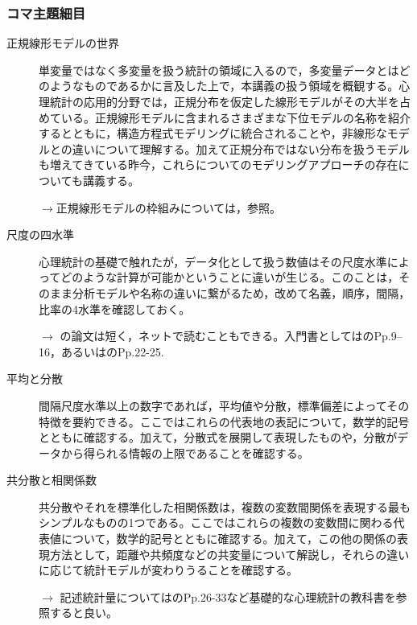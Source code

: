 \subsubsection{コマ主題細目}
\begin{description}
\item[正規線形モデルの世界]単変量ではなく多変量を扱う統計の領域に入るので，多変量データとはどのようなものであるかに言及した上で，本講義の扱う領域を概観する。心理統計の応用的分野では，正規分布を仮定した線形モデルがその大半を占めている。正規線形モデルに含まれるさまざまな下位モデルの名称を紹介するとともに，構造方程式モデリングに統合されることや，非線形なモデルとの違いについて理解する。加えて正規分布ではない分布を扱うモデルも増えてきている昨今，これらについてのモデリングアプローチの存在についても講義する。
\begin{flushright}
    $\to$正規線形モデルの枠組みについては，\citet{三中2018}参照。
\end{flushright}

\item[尺度の四水準]心理統計の基礎で触れたが，データ化として扱う数値はその尺度水準によってどのような計算が可能かということに違いが生じる。このことは，そのまま分析モデルや名称の違いに繋がるため，改めて名義，順序，間隔，比率の4水準を確認しておく。
\begin{flushright}
    $\to$ \citet{stevens1946}の論文は短く，ネットで読むこともできる。入門書としては\citet{川端201408}のPp.9--16，あるいは\citet{Yamada2004}のPp.22-25.
\end{flushright}

\item[平均と分散]間隔尺度水準以上の数字であれば，平均値や分散，標準偏差によってその特徴を要約できる。ここではこれらの代表地の表記について，数学的記号とともに確認する。加えて，分散式を展開して表現したものや，分散がデータから得られる情報の上限であることを確認する。

\item[共分散と相関係数]共分散やそれを標準化した相関係数は，複数の変数間関係を表現する最もシンプルなものの1つである。ここではこれらの複数の変数間に関わる代表値について，数学的記号とともに確認する。加えて，この他の関係の表現方法として，距離や共頻度などの共変量について解説し，それらの違いに応じて統計モデルが変わりうることを確認する。

\begin{flushright}
    $\to$ 記述統計量については\citet{川端201408}のPp.26-33など基礎的な心理統計の教科書を参照すると良い。
\end{flushright}


\end{description}
